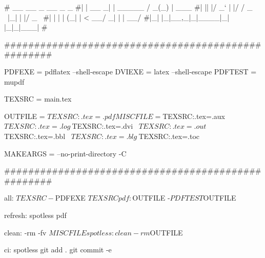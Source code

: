 
# __  __       _         __ _ _      
#|  \/  | __ _| | _____ / _(_) | ___ 
#| |\/| |/ _` | |/ / _ \ |_| | |/ _ \
#| |  | | (_| |   <  __/  _| | |  __/
#|_|  |_|\__,_|_|\_\___|_| |_|_|\___|
#                                    

###################################################

PDFEXE    = pdflatex --shell-escape
DVIEXE    = latex --shell-escape
PDFTEST   = mupdf

TEXSRC    = main.tex

OUTFILE   = ${TEXSRC:.tex=.pdf}

MISCFILE  = ${TEXSRC:.tex=.aux} \
	    ${TEXSRC:.tex=.log} \
	    ${TEXSRC:.tex=.dvi} \
	    ${TEXSRC:.tex=.out} \
	    ${TEXSRC:.tex=.bbl} \
	    ${TEXSRC:.tex=.blg} \
	    ${TEXSRC:.tex=.toc} \

MAKEARGS  = --no-print-directory -C

###################################################

all: ${TEXSRC} 
	-${PDFEXE} ${TEXSRC}

pdf: ${OUTFILE}
	-${PDFTEST} ${OUTFILE}

refresh: spotless pdf

clean:
	-rm -fv ${MISCFILE}

spotless: clean 
	-rm ${OUTFILE}

ci: spotless
	git add .
	git commit -e
